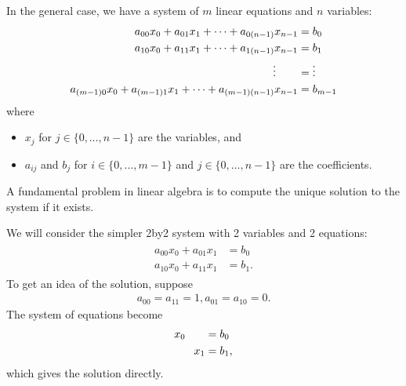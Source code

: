 \documentclass[letterpaper,10pt,english]{sphinxmanual}
\begin{document}
In the general case, we have a system of \(m\) linear equations and \(n\) variables:
\begin{equation*}
\begin{split} \begin{aligned}
a_{00} x_0 + a_{01} x_1 + \dots + a_{0(n-1)} x_{n-1} &= b_0\\
a_{10} x_0 + a_{11} x_1 + \dots + a_{1(n-1)} x_{n-1} &= b_1\\
\vdots\kern2em &= \vdots\\
a_{(m-1)0} x_0 + a_{(m-1)1} x_1 + \dots + a_{(m-1)(n-1)} x_{n-1} &= b_{m-1}\\
\end{aligned}
\end{split}
\end{equation*}
where
\begin{itemize}
\item {} 
\(x_j\) for \(j\in \{0,\dots,n-1\}\) are the variables, and

\item {} 
\(a_{ij}\) and \(b_j\) for \(i\in \{0,\dots,m-1\}\) and \(j\in \{0,\dots,n-1\}\) are the coefficients.

\end{itemize}

A fundamental problem in linear algebra is to compute the unique solution to the system if it exists.

We will consider the simpler 2\sphinxhyphen{}by\sphinxhyphen{}2 system with 2 variables and 2 equations:
\begin{equation*}
\begin{split} \begin{aligned}
a_{00} x_0 + a_{01} x_1 &= b_0\\
a_{10} x_0 + a_{11} x_1 &= b_1.
\end{aligned}
\end{split}
\end{equation*}
To get an idea of the solution, suppose
\begin{equation*}
\begin{split}a_{00}=a_{11}=1, a_{01} = a_{10} = 0.\end{split}
\end{equation*}
The system of equations become
\begin{equation*}
\begin{split} \begin{aligned}
x_0 \hphantom{+ x_1} &= b_0\\
\hphantom{x_0 +}  x_1 &= b_1,
\end{aligned}
\end{split}
\end{equation*}
which gives the solution directly.
\end{document}
